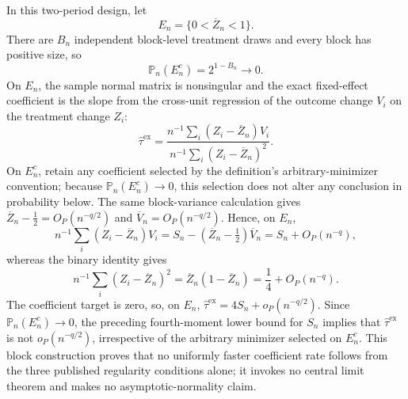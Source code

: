 In this two-period design, let
\[
E_n=\{0<\overline Z_n<1\}.
\]
There are \(B_n\) independent block-level treatment draws and every block has positive size, so
\[
\mathbb P_n(E_n^c)=2^{1-B_n}\longrightarrow0.
\]
On \(E_n\), the sample normal matrix is nonsingular and the exact fixed-effect coefficient is the slope from the cross-unit regression of the outcome change \(V_i\) on the treatment change \(Z_i\):
\[
\widehat\tau^{\mathrm{ex}}
=\frac{n^{-1}\sum_i(Z_i-\overline Z_n)V_i}
       {n^{-1}\sum_i(Z_i-\overline Z_n)^2}.
\]
On \(E_n^c\), retain any coefficient selected by the definition's arbitrary-minimizer convention; because \(\mathbb P_n(E_n^c)\to0\), this selection does not alter any conclusion in probability below. The same block-variance calculation gives
\(\overline Z_n-\tfrac12=O_P(n^{-q/2})\) and
\(\overline V_n=O_P(n^{-q/2})\). Hence, on \(E_n\),
\[
n^{-1}\sum_i(Z_i-\overline Z_n)V_i
=S_n-(\overline Z_n-\tfrac12)\overline V_n
=S_n+O_P(n^{-q}),
\]
whereas the binary identity gives
\[
n^{-1}\sum_i(Z_i-\overline Z_n)^2
=\overline Z_n(1-\overline Z_n)
=\frac14+O_P(n^{-q}).
\]
The coefficient target is zero, so, on \(E_n\),
\(\widehat\tau^{\mathrm{ex}}=4S_n+o_P(n^{-q/2})\). Since \(\mathbb P_n(E_n^c)\to0\), the preceding fourth-moment lower bound for \(S_n\) implies that \(\widehat\tau^{\mathrm{ex}}\) is not \(o_P(n^{-q/2})\), irrespective of the arbitrary minimizer selected on \(E_n^c\). This block construction proves that no uniformly faster coefficient rate follows from the three published regularity conditions alone; it invokes no central limit theorem and makes no asymptotic-normality claim.
